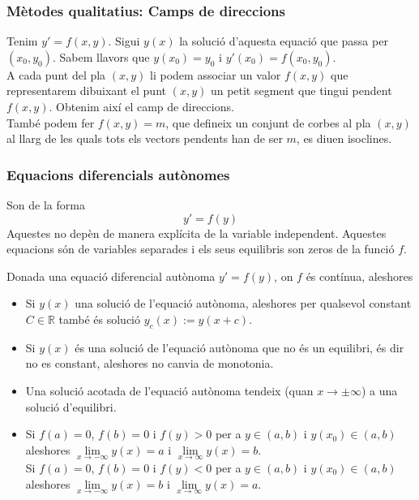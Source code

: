 \documentclass[../main.tex]{subfiles}
\begin{document}
\subsubsection{Mètodes qualitatius: Camps de direccions}
Tenim $y' = f(x,y)$. Sigui $y(x)$ la solució d'aquesta equació que passa per $(x_0, y_0)$. Sabem
llavors que $y(x_0) = y_0$ i $y'(x_0) = f(x_0, y_0)$.\\
A cada punt del pla $(x, y)$ li podem associar un valor $f(x,y)$ que representarem dibuixant el
punt $(x,y)$ un petit segment que tingui pendent $f(x,y)$. Obtenim així el camp de direccions.\\
També podem fer $f(x,y) = m$, que defineix un conjunt de corbes al pla $(x,y)$ al llarg de les
quals tots els vectors pendents han de ser $m$, es diuen isoclines.

\subsubsection{Equacions diferencials autònomes}
Son de la forma
\begin{displaymath}
	y' = f(y)
\end{displaymath}
Aquestes no depèn de manera explícita de la variable independent. Aquestes equacions són de
variables separades i els seus equilibris son zeros de la funció $f$.
\begin{teorema}
    Donada una equació diferencial autònoma $y' = f(y)$, on $f$ és contínua, aleshores
    \begin{itemize}
        \item Si $y(x)$ una solució de l'equació autònoma, aleshores per qualsevol constant $C \in \mathbb{R}$
        també és solució $y_c(x):= y(x+c)$.
        \item Si $y(x)$ és una solució de l'equació autònoma que no és un equilibri, és dir no es
        constant, aleshores no canvia de monotonia.
        \item Una solució acotada de l'equació autònoma tendeix (quan $x \to \pm \infty$) a
        una solució d'equilibri.
        \item Si $f(a) = 0$, $f(b) = 0$ i $f(y) > 0$ per a $y \in (a, b)$ i $y(x_0) \in (a, b)$
        aleshores $\lim\limits_{x \to -\infty} y(x) = a$ i $\lim\limits_{x \to \infty} y(x) = b$.\\
        Si $f(a) = 0$, $f(b) = 0$ i $f(y) < 0$ per a $y \in (a, b)$ i $y(x_0) \in (a, b)$
        aleshores $\lim\limits_{x \to -\infty} y(x) = b$ i $\lim\limits_{x \to \infty} y(x) = a$.
    \end{itemize}
\end{teorema}\newpage
\end{document}
